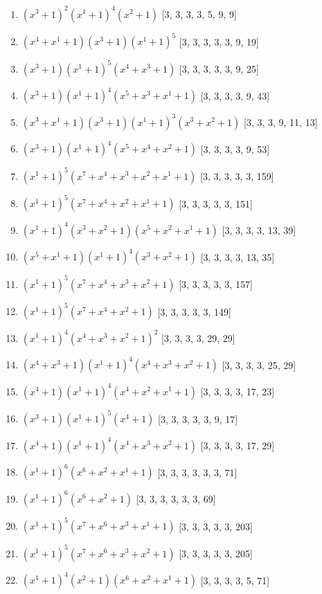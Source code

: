 \documentclass[10pt,twocolumn]{article}
\begin{document}
\begin{enumerate}
\item $(x^{3} + 1)^{2}(x^{1} + 1)^{4}(x^{2} + 1)$  [3, 3, 3, 3, 5, 9, 9]
\item $(x^{4} + x^{1} + 1)(x^{3} + 1)(x^{1} + 1)^{5}$  [3, 3, 3, 3, 3, 9, 19]
\item $(x^{3} + 1)(x^{1} + 1)^{5}(x^{4} + x^{3} + 1)$  [3, 3, 3, 3, 3, 9, 25]
\item $(x^{3} + 1)(x^{1} + 1)^{4}(x^{5} + x^{3} + x^{1} + 1)$  [3, 3, 3, 3, 9, 43]
\item $(x^{3} + x^{1} + 1)(x^{3} + 1)(x^{1} + 1)^{3}(x^{3} + x^{2} + 1)$  [3, 3, 3, 9, 11, 13]
\item $(x^{3} + 1)(x^{1} + 1)^{4}(x^{5} + x^{4} + x^{2} + 1)$  [3, 3, 3, 3, 9, 53]
\item $(x^{1} + 1)^{5}(x^{7} + x^{4} + x^{3} + x^{2} + x^{1} + 1)$  [3, 3, 3, 3, 3, 159]
\item $(x^{1} + 1)^{5}(x^{7} + x^{4} + x^{2} + x^{1} + 1)$  [3, 3, 3, 3, 3, 151]
\item $(x^{1} + 1)^{4}(x^{3} + x^{2} + 1)(x^{5} + x^{2} + x^{1} + 1)$  [3, 3, 3, 3, 13, 39]
\item $(x^{5} + x^{1} + 1)(x^{1} + 1)^{4}(x^{3} + x^{2} + 1)$  [3, 3, 3, 3, 13, 35]
\item $(x^{1} + 1)^{5}(x^{7} + x^{4} + x^{3} + x^{2} + 1)$  [3, 3, 3, 3, 3, 157]
\item $(x^{1} + 1)^{5}(x^{7} + x^{4} + x^{2} + 1)$  [3, 3, 3, 3, 3, 149]
\item $(x^{1} + 1)^{4}(x^{4} + x^{3} + x^{2} + 1)^{2}$  [3, 3, 3, 3, 29, 29]
\item $(x^{4} + x^{3} + 1)(x^{1} + 1)^{4}(x^{4} + x^{3} + x^{2} + 1)$  [3, 3, 3, 3, 25, 29]
\item $(x^{4} + 1)(x^{1} + 1)^{4}(x^{4} + x^{2} + x^{1} + 1)$  [3, 3, 3, 3, 17, 23]
\item $(x^{3} + 1)(x^{1} + 1)^{5}(x^{4} + 1)$  [3, 3, 3, 3, 3, 9, 17]
\item $(x^{4} + 1)(x^{1} + 1)^{4}(x^{4} + x^{3} + x^{2} + 1)$  [3, 3, 3, 3, 17, 29]
\item $(x^{1} + 1)^{6}(x^{6} + x^{2} + x^{1} + 1)$  [3, 3, 3, 3, 3, 3, 71]
\item $(x^{1} + 1)^{6}(x^{6} + x^{2} + 1)$  [3, 3, 3, 3, 3, 3, 69]
\item $(x^{1} + 1)^{5}(x^{7} + x^{6} + x^{3} + x^{1} + 1)$  [3, 3, 3, 3, 3, 203]
\item $(x^{1} + 1)^{5}(x^{7} + x^{6} + x^{3} + x^{2} + 1)$  [3, 3, 3, 3, 3, 205]
\item $(x^{1} + 1)^{4}(x^{2} + 1)(x^{6} + x^{2} + x^{1} + 1)$  [3, 3, 3, 3, 5, 71]

\end{enumerate}
\end{document}
